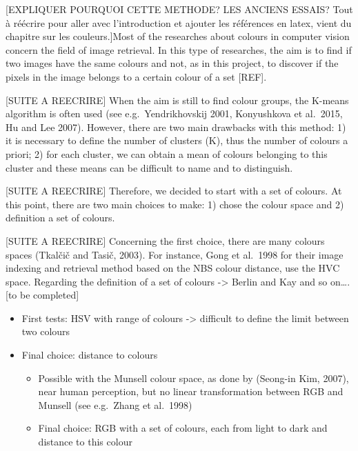 \documentclass[11pt,a4paper]{article}
\begin{document}

{[}EXPLIQUER POURQUOI CETTE METHODE? LES ANCIENS ESSAIS? Tout à réécrire
pour aller avec l'introduction et ajouter les références en latex, vient
du chapitre sur les couleurs.{]}Most of the researches about colours in
computer vision concern the field of image retrieval. In this type of
researches, the aim is to find if two images have the same colours and
not, as in this project, to discover if the pixels in the image belongs
to a certain colour of a set {[}REF{]}.

{[}SUITE A REECRIRE{]} When the aim is still to find colour groups, the
K-means algorithm is often used (see e.g.~Yendrikhovskij 2001,
Konyushkova et al.~2015, Hu and Lee 2007). However, there are two main
drawbacks with this method: 1) it is necessary to define the number of
clusters (K), thus the number of colours a priori; 2) for each cluster,
we can obtain a mean of colours belonging to this cluster and these
means can be difficult to name and to distinguish.

{[}SUITE A REECRIRE{]} Therefore, we decided to start with a set of
colours. At this point, there are two main choices to make: 1) chose the
colour space and 2) definition a set of colours.

{[}SUITE A REECRIRE{]} Concerning the first choice, there are many
colours spaces (Tkalčič and Tasič, 2003). For instance, Gong et al.~1998
for their image indexing and retrieval method based on the NBS colour
distance, use the HVC space. Regarding the definition of a set of
colours -\textgreater{} Berlin and Kay and so on\ldots{}. {[}to be
completed{]}

\begin{itemize}

\item
  First tests: HSV with range of colours -\textgreater{} difficult to
  define the limit between two colours
\item
  Final choice: distance to colours

\begin{itemize}

  \item
    Possible with the Munsell colour space, as done by (Seong-in Kim,
    2007), near human perception, but no linear transformation between
    RGB and Munsell (see e.g.~Zhang et al.~1998)
  \item
    Final choice: RGB with a set of colours, each from light to dark and
    distance to this colour
  \end{itemize}
\end{itemize}
\end{document}

